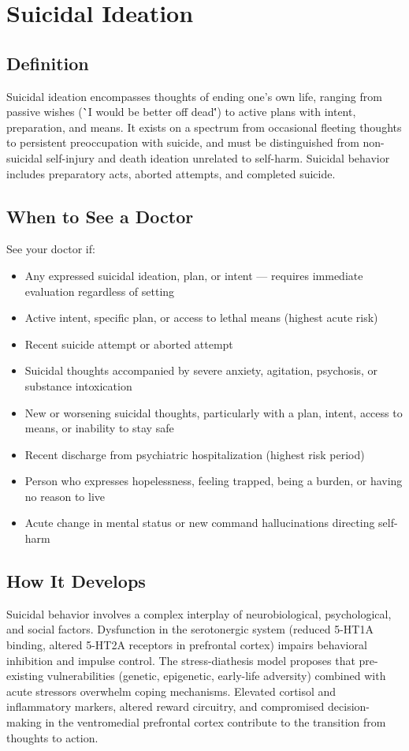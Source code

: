 \chapter{Suicidal Ideation}

\section*{Definition}
Suicidal ideation encompasses thoughts of ending one's own life, ranging from passive wishes (\``I would be better off dead\'') to active plans with intent, preparation, and means. It exists on a spectrum from occasional fleeting thoughts to persistent preoccupation with suicide, and must be distinguished from non-suicidal self-injury and death ideation unrelated to self-harm. Suicidal behavior includes preparatory acts, aborted attempts, and completed suicide.

\section*{When to See a Doctor}
See your doctor if:
\begin{itemize}
  \item Any expressed suicidal ideation, plan, or intent --- requires immediate evaluation regardless of setting
  \item Active intent, specific plan, or access to lethal means (highest acute risk)
  \item Recent suicide attempt or aborted attempt
  \item Suicidal thoughts accompanied by severe anxiety, agitation, psychosis, or substance intoxication
  \item New or worsening suicidal thoughts, particularly with a plan, intent, access to means, or inability to stay safe
  \item Recent discharge from psychiatric hospitalization (highest risk period)
  \item Person who expresses hopelessness, feeling trapped, being a burden, or having no reason to live
  \item Acute change in mental status or new command hallucinations directing self-harm
\end{itemize}

\section*{How It Develops}
Suicidal behavior involves a complex interplay of neurobiological, psychological, and social factors. Dysfunction in the serotonergic system (reduced 5-HT1A binding, altered 5-HT2A receptors in prefrontal cortex) impairs behavioral inhibition and impulse control. The stress-diathesis model proposes that pre-existing vulnerabilities (genetic, epigenetic, early-life adversity) combined with acute stressors overwhelm coping mechanisms. Elevated cortisol and inflammatory markers, altered reward circuitry, and compromised decision-making in the ventromedial prefrontal cortex contribute to the transition from thoughts to action.

